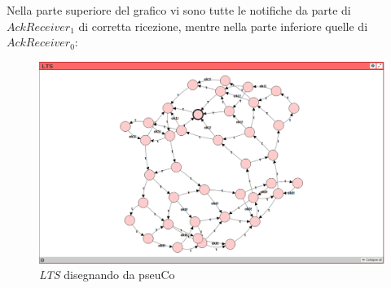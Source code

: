 Nella parte superiore del grafico vi sono tutte le notifiche da parte di
\texttt{$AckReceiver_1$} di corretta ricezione, mentre nella parte inferiore
quelle di \texttt{$AckReceiver_0$}:

\begin{figure}[H]
  \centering
  \includegraphics[width=.8\columnwidth]{images/pseuco.eps}
  \caption{\emph{LTS} disegnando da pseuCo}
  \label{fig:ccs-abp}
\end{figure}
